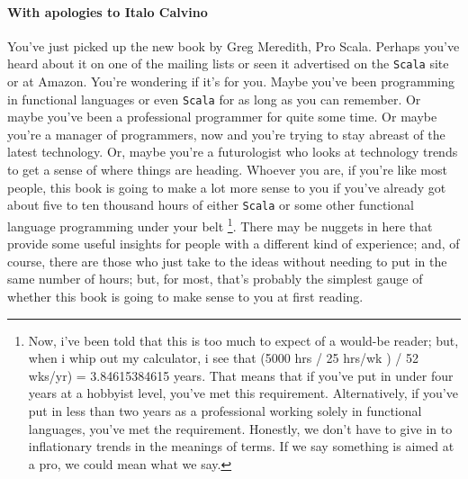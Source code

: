 \paragraph{With apologies to Italo Calvino} You've just picked up the
new book by Greg Meredith, Pro Scala. Perhaps you've heard about it on
one of the mailing lists or seen it advertised on the \texttt{Scala}
site or at Amazon. You're wondering if it's for you. Maybe you've been
programming in functional languages or even \texttt{Scala} for as long
as you can remember. Or maybe you've been a professional programmer
for quite some time. Or maybe you're a manager of programmers, now and
you're trying to stay abreast of the latest technology. Or, maybe
you're a futurologist who looks at technology trends to get a sense of
where things are heading. Whoever you are, if you're like most people,
this book is going to make a lot more sense to you if you've already
got about five to ten thousand hours of either \texttt{Scala} or some
other functional language programming under your belt \footnote{ Now,
i've been told that this is too much to expect of a would-be reader;
but, when i whip out my calculator, i see that (5000 hrs / 25 hrs/wk )
/ 52 wks/yr) = 3.84615384615 years. That means that if you've put in
under four years at a hobbyist level, you've met this
requirement. Alternatively, if you've put in less than two years as a
professional working solely in functional languages, you've met the
requirement. Honestly, we don't have to give in to inflationary trends
in the meanings of terms. If we say something is aimed at a pro, we
could mean what we say. }. There may be nuggets in here that provide
some useful insights for people with a different kind of experience;
and, of course, there are those who just take to the ideas without
needing to put in the same number of hours; but, for most, that's
probably the simplest gauge of whether this book is going to make
sense to you at first reading.

